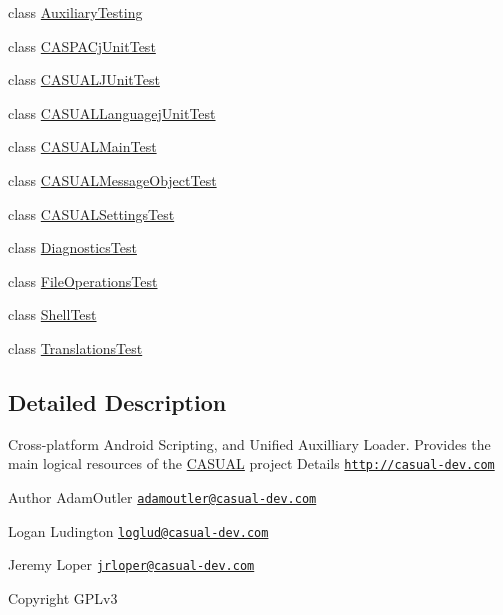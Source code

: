 \begin{DoxyCompactItemize}
\item 
class \hyperlink{class_c_a_s_u_a_l_1_1_auxiliary_testing}{Auxiliary\-Testing}
\item 
class \hyperlink{class_c_a_s_u_a_l_1_1_c_a_s_p_a_cj_unit_test}{C\-A\-S\-P\-A\-Cj\-Unit\-Test}
\item 
class \hyperlink{class_c_a_s_u_a_l_1_1_c_a_s_u_a_l_j_unit_test}{C\-A\-S\-U\-A\-L\-J\-Unit\-Test}
\item 
class \hyperlink{class_c_a_s_u_a_l_1_1_c_a_s_u_a_l_languagej_unit_test}{C\-A\-S\-U\-A\-L\-Languagej\-Unit\-Test}
\item 
class \hyperlink{class_c_a_s_u_a_l_1_1_c_a_s_u_a_l_main_test}{C\-A\-S\-U\-A\-L\-Main\-Test}
\item 
class \hyperlink{class_c_a_s_u_a_l_1_1_c_a_s_u_a_l_message_object_test}{C\-A\-S\-U\-A\-L\-Message\-Object\-Test}
\item 
class \hyperlink{class_c_a_s_u_a_l_1_1_c_a_s_u_a_l_settings_test}{C\-A\-S\-U\-A\-L\-Settings\-Test}
\item 
class \hyperlink{class_c_a_s_u_a_l_1_1_diagnostics_test}{Diagnostics\-Test}
\item 
class \hyperlink{class_c_a_s_u_a_l_1_1_file_operations_test}{File\-Operations\-Test}
\item 
class \hyperlink{class_c_a_s_u_a_l_1_1_shell_test}{Shell\-Test}
\item 
class \hyperlink{class_c_a_s_u_a_l_1_1_translations_test}{Translations\-Test}
\end{DoxyCompactItemize}


\subsection{Detailed Description}
Cross-\/platform Android Scripting, and Unified Auxilliary Loader. Provides the main logical resources of the \hyperlink{namespace_c_a_s_u_a_l}{C\-A\-S\-U\-A\-L} project Details \href{http://casual-dev.com}{\tt http\-://casual-\/dev.\-com} \begin{DoxyAuthor}{Author}
Adam\-Outler \href{mailto:adamoutler@casual-dev.com}{\tt adamoutler@casual-\/dev.\-com} 

Logan Ludington \href{mailto:loglud@casual-dev.com}{\tt loglud@casual-\/dev.\-com} 

Jeremy Loper \href{mailto:jrloper@casual-dev.com}{\tt jrloper@casual-\/dev.\-com} 
\end{DoxyAuthor}
\begin{DoxyCopyright}{Copyright}
G\-P\-Lv3 
\end{DoxyCopyright}
